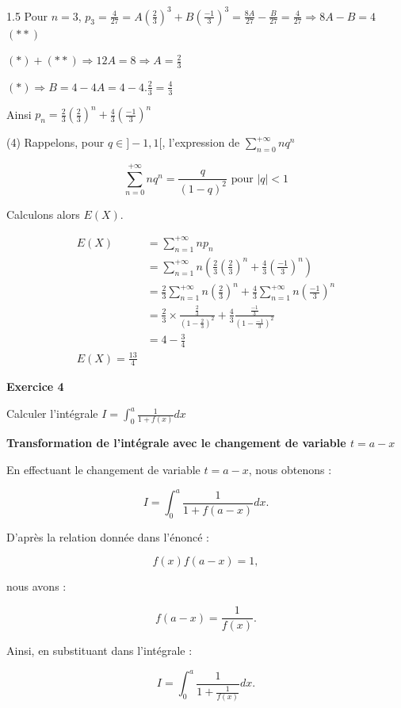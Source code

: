 \documentclass[12pt]{article}
\begin{document}
\begin{spacing}{1.5}
Pour $n=3$, $p_3=\frac{4}{27}=A\left(\frac{2}{3}\right)^3+B\left(\frac{-1}{3}\right)^3=\frac{8A}{27}-\frac{B}{27}=\frac{4}{27}\Rightarrow 8A-B=4$ $(**)$
 
 $(*)+(**)\Longrightarrow 12A=8\Longrightarrow A=\frac{2}{3}$
 
$(*)\Longrightarrow B=4-4A=4-4.\frac{2}{3}=\frac{4}{3}$

Ainsi $p_n=\frac{2}{3}\left(\frac{2}{3}\right)^n+\frac{4}{3}\left(\frac{-1}{3}\right)^n$


 
 (4) Rappelons, pour $q \in ]-1,1[$, l'expression de       
$\sum_{n=0}^{+\infty}nq^n$

\[\sum_{n=0}^{+\infty}nq^n=\frac{q}{(1-q)^2} \text{ pour } \vert q\vert<1\]


\quad Calculons alors $E(X)$.
 
 \begin{align*}
 E(X)&=\sum_{n=1}^{+\infty}np_n\\
 &=\sum_{n=1}^{+\infty}n\left(\frac{2}{3}\left(\frac{2}{3}\right)^n+\frac{4}{3}\left(\frac{-1}{3}\right)^n\right)\\
 &=\frac{2}{3}\sum_{n=1}^{+\infty}n\left(\frac{2}{3}\right)^n + \frac{4}{3}\sum_{n=1}^{+\infty}n\left(\frac{-1}{3}\right)^n\\
 &=\frac{2}{3}\times \frac{\frac{2}{3}}{(1-\frac{2}{3})^2}+\frac{4}{3} \frac{\frac{-1}{3}}{(1-\frac{-1}{3})^2}\\
 &=4-\frac{3}{4}\\
 E(X)=\frac{13}{4}
 \end{align*}
 
 
 
 
 
 \medskip\textbf{Exercice 4}
 
 Calculer l'intégrale $I = \int_{0}^{a}\frac{1}{1+f(x)}dx$
 
 \textbf{ Transformation de l'intégrale avec le changement de variable $t = a-x$}

En effectuant le changement de variable $t = a-x$, nous obtenons :

\[
I = \int_0^a \frac{1}{1+f(a-x)}dx.
\]

D'après la relation donnée dans l'énoncé :

\[
f(x) f(a-x) = 1,
\]

nous avons :

\[
f(a-x) = \frac{1}{f(x)}.
\]

Ainsi, en substituant dans l'intégrale :

\[
I = \int_0^a \frac{1}{1+\frac{1}{f(x)}}dx.
\]


\end{spacing}
\end{document}
